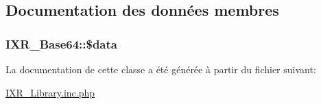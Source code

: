 \subsection{Documentation des donn\'{e}es membres}
\hypertarget{classIXR__Base64_o0}{
\subsubsection[\$data]{\setlength{\rightskip}{0pt plus 5cm}IXR\_\-Base64::\$data}}
\label{classIXR__Base64_o0}




La documentation de cette classe a \'{e}t\'{e} g\'{e}n\'{e}r\'{e}e \`{a} partir du fichier suivant:\begin{CompactItemize}
\item 
\hyperlink{IXR__Library_8inc_8php}{IXR\_\-Library.inc.php}\end{CompactItemize}
